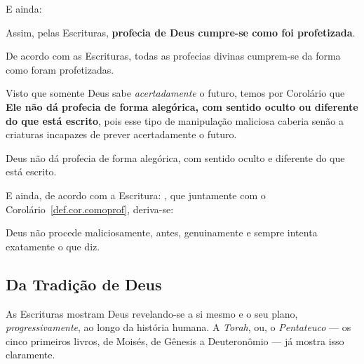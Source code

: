     E ainda:


    Assim, pelas Escrituras, \textbf{profecia de Deus cumpre-se como foi profetizada}.

    \begin{DEF}
        \label{def.pri.comoprof}
        De acordo com as Escrituras, todas as profecias divinas cumprem-se da forma como foram profetizadas.
    \end{DEF}

    Visto que somente Deus sabe \emph{acertadamente} o futuro, temos por Corolário que \textbf{Ele  não  dá  profecia  de  forma
    alegórica, com sentido oculto ou diferente do que está escrito}, pois esse tipo de manipulação  maliciosa  caberia  senão  a
    criaturas incapazes de prever acertadamente o futuro.

    \begin{COR}
        \label{def.cor.comoprof}
        Deus não dá profecia de forma alegórica, com sentido oculto e diferente do que está escrito.
    \end{COR}

    E ainda, de acordo com a Escritura: , que
    juntamente com o Corolário~\ref{def.cor.comoprof}, deriva-se:

    \begin{COR}
        \label{def.cor.genu}
        Deus não procede maliciosamente, antes, genuinamente e sempre intenta exatamente o que diz.
    \end{COR}


    \subsection{Da Tradição de Deus}

    As Escrituras mostram Deus revelando-se a si mesmo e o seu plano, \emph{progressivamente}, ao longo da  história  humana.  A
    \emph{Torah}, ou, o \emph{Pentateuco} --- os cinco primeiros livros, de Moisés, de Gênesis a Deuteronômio --- já mostra isso
    claramente.

